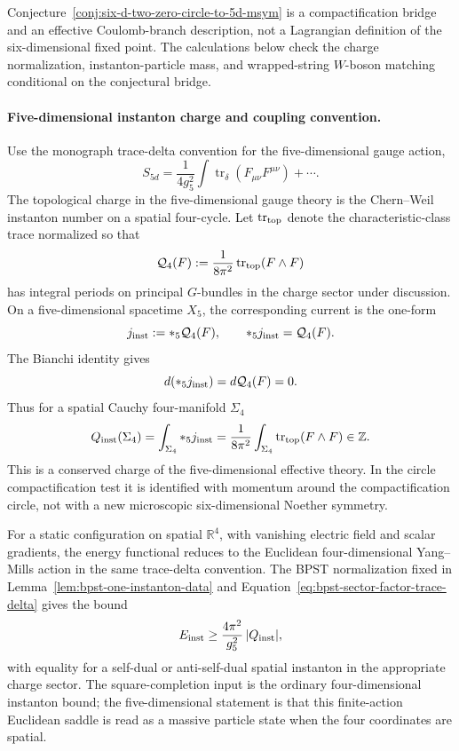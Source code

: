 Conjecture~\ref{conj:six-d-two-zero-circle-to-5d-msym} is a compactification
bridge and an effective Coulomb-branch description, not a Lagrangian
definition of the six-dimensional fixed point.  The calculations below check
the charge normalization, instanton-particle mass, and wrapped-string
\(W\)-boson matching conditional on the conjectural bridge.

\paragraph{Five-dimensional instanton charge and coupling convention.}
Use the monograph trace-delta convention for the five-dimensional gauge
action,
\[
  S_{5d}
  =
  \frac1{4g_5^2}
  \int \operatorname{tr}_{\delta}(F_{\mu\nu}F^{\mu\nu})
  +\cdots .
\]
The topological charge in the five-dimensional gauge theory is the
Chern--Weil instanton number on a spatial four-cycle.  Let
\(\operatorname{tr}_{\rm top}\) denote the characteristic-class trace
normalized so that
\[
  \mathcal Q_4(F)
  :=
  \frac1{8\pi^2}\operatorname{tr}_{\rm top}(F\wedge F)
\]
has integral periods on principal \(G\)-bundles in the charge sector under
discussion.  On a five-dimensional spacetime \(X_5\), the corresponding
current is the one-form
\[
  j_{\rm inst}:=*_{5}\mathcal Q_4(F),
  \qquad
  *_{5}j_{\rm inst}=\mathcal Q_4(F).
\]
The Bianchi identity gives
\[
  d(*_{5}j_{\rm inst})=d\mathcal Q_4(F)=0 .
\]
Thus for a spatial Cauchy four-manifold \(\Sigma_4\)
\begin{equation}
  Q_{\rm inst}(\Sigma_4)
  =
  \int_{\Sigma_4}*_{5}j_{\rm inst}
  =
  \frac1{8\pi^2}
  \int_{\Sigma_4}\operatorname{tr}_{\rm top}(F\wedge F)
  \in\mathbb Z .
  \label{eq:six-d-five-d-instanton-charge}
\end{equation}
This is a conserved charge of the five-dimensional effective theory.  In the
circle compactification test it is identified with momentum around the
compactification circle, not with a new microscopic six-dimensional Noether
symmetry.

For a static configuration on spatial \(\mathbb R^4\), with vanishing electric
field and scalar gradients, the energy functional reduces to the Euclidean
four-dimensional Yang--Mills action in the same trace-delta convention.  The
BPST normalization fixed in
Lemma~\ref{lem:bpst-one-instanton-data} and
Equation~\eqref{eq:bpst-sector-factor-trace-delta} gives the bound
\begin{equation}
  E_{\rm inst}
  \ge
  \frac{4\pi^2}{g_5^2}\,|Q_{\rm inst}|,
  \label{eq:six-d-five-d-instanton-energy-bound}
\end{equation}
with equality for a self-dual or anti-self-dual spatial instanton in the
appropriate charge sector.  The square-completion input is the ordinary
four-dimensional instanton bound; the five-dimensional statement is that this
finite-action Euclidean saddle is read as a massive particle state when the
four coordinates are spatial.

